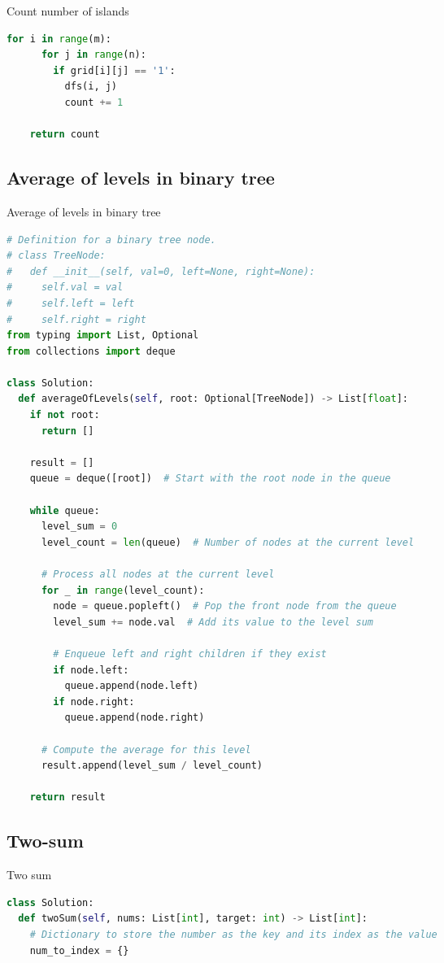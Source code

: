 \documentclass[a4paper,12pt]{article}
\begin{document}
\begin{multicols}{2}
\begin{mycode}[label={lst:add-two-numbers}]{Count number of islands}
\begin{lstlisting}[language=Python]
    for i in range(m):
      for j in range(n):
        if grid[i][j] == '1':
          dfs(i, j)
          count += 1

    return count
\end{lstlisting}
\end{mycode}

\subsection{Average of levels in binary tree}

\begin{mycode}[label={lst:average-of-levels}]{Average of levels in binary tree}
\begin{lstlisting}[language=Python]
# Definition for a binary tree node.
# class TreeNode:
#   def __init__(self, val=0, left=None, right=None):
#     self.val = val
#     self.left = left
#     self.right = right
from typing import List, Optional
from collections import deque

class Solution:
  def averageOfLevels(self, root: Optional[TreeNode]) -> List[float]:
    if not root:
      return []
    
    result = []
    queue = deque([root])  # Start with the root node in the queue
    
    while queue:
      level_sum = 0
      level_count = len(queue)  # Number of nodes at the current level
      
      # Process all nodes at the current level
      for _ in range(level_count):
        node = queue.popleft()  # Pop the front node from the queue
        level_sum += node.val  # Add its value to the level sum
        
        # Enqueue left and right children if they exist
        if node.left:
          queue.append(node.left)
        if node.right:
          queue.append(node.right)
      
      # Compute the average for this level
      result.append(level_sum / level_count)
    
    return result
\end{lstlisting}
\end{mycode}

\subsection{Two-sum}

\begin{mycode}[label={lst:two-sum}]{Two sum}
\begin{lstlisting}[language=Python]
class Solution:
  def twoSum(self, nums: List[int], target: int) -> List[int]:
    # Dictionary to store the number as the key and its index as the value
    num_to_index = {}
    

\end{lstlisting}
\end{mycode}
\end{multicols}
\end{document}
